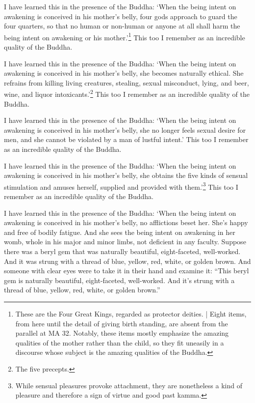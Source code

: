 \documentclass[12pt,openany]{book}%
\begin{document}
I have learned this in the presence of the Buddha: ‘When the being intent on awakening is conceived in his mother’s belly, four gods approach to guard the four quarters, so that no human or non-human or anyone at all shall harm the being intent on awakening or his mother.’\footnote{These are the Four Great Kings, regarded as protector deities. | Eight items, from here until the detail of giving birth standing, are absent from the parallel at MA 32. Notably, these items mostly emphasize the amazing qualities of the mother rather than the child, so they fit uneasily in a discourse whose subject is the amazing qualities of the Buddha. } This too I remember as an incredible quality of the Buddha. 

I have learned this in the presence of the Buddha: ‘When the being intent on awakening is conceived in his mother’s belly, she becomes naturally ethical. She refrains from killing living creatures, stealing, sexual misconduct, lying, and beer, wine, and liquor intoxicants.’\footnote{The five precepts. } This too I remember as an incredible quality of the Buddha. 

I have learned this in the presence of the Buddha: ‘When the being intent on awakening is conceived in his mother’s belly, she no longer feels sexual desire for men, and she cannot be violated by a man of lustful intent.’ This too I remember as an incredible quality of the Buddha. 

I have learned this in the presence of the Buddha: ‘When the being intent on awakening is conceived in his mother’s belly, she obtains the five kinds of sensual stimulation and amuses herself, supplied and provided with them.’\footnote{While sensual pleasures provoke attachment, they are nonetheless a kind of pleasure and therefore a sign of virtue and good past kamma. } This too I remember as an incredible quality of the Buddha. 

I have learned this in the presence of the Buddha: ‘When the being intent on awakening is conceived in his mother’s belly, no afflictions beset her. She’s happy and free of bodily fatigue. And she sees the being intent on awakening in her womb, whole in his major and minor limbs, not deficient in any faculty. Suppose there was a beryl gem that was naturally beautiful, eight-faceted, well-worked. And it was strung with a thread of blue, yellow, red, white, or golden brown. And someone with clear eyes were to take it in their hand and examine it: “This beryl gem is naturally beautiful, eight-faceted, well-worked. And it’s strung with a thread of blue, yellow, red, white, or golden brown.” 
\end{document}
